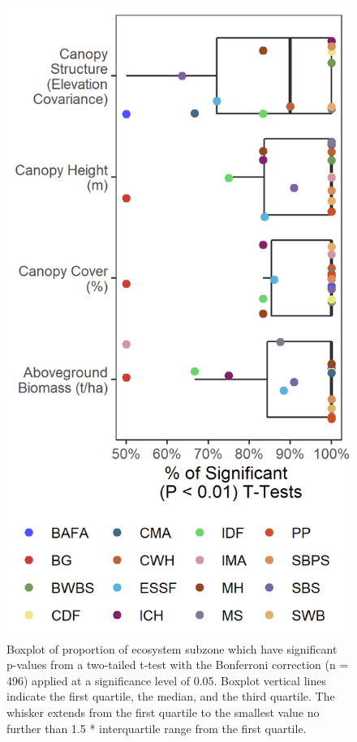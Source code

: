 \documentclass[10pt,oneside]{article}
\makeatletter
\def\maxwidth{\ifdim\Gin@nat@width>\linewidth\linewidth
\else\Gin@nat@width\fi}
\let\Oldincludegraphics\includegraphics
\renewcommand{\includegraphics}[1]{\Oldincludegraphics[width=\maxwidth]{#1}}
\makeatother
\begin{document}
\begin{figure}
\hypertarget{fig:t-test-plot}{%
\centering
\includegraphics{figures/t_tests_scatter.png}
\caption{Boxplot of proportion of ecosystem subzone which have
significant p-values from a two-tailed t-test with the Bonferroni
correction (n = 496) applied at a significance level of 0.05. Boxplot
vertical lines indicate the first quartile, the median, and the third
quartile. The whisker extends from the first quartile to the smallest
value no further than 1.5 * interquartile range from the first
quartile.}\label{fig:t-test-plot}
}
\end{figure}
\end{document}
